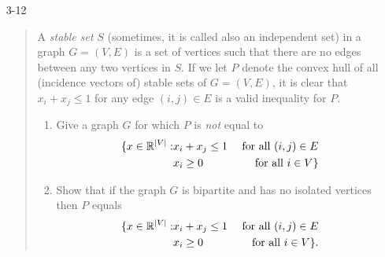 \documentclass[12pt]{article}
\begin{document}
\begin{enumerate}


\item[3-12]
\begin{quote}
A {\it stable set} $S$ (sometimes, it is called also an independent
set) in a graph $G=(V,E)$ is a set of vertices such that there are no
edges between any two vertices in $S$. If we let $P$ denote the convex
hull of all (incidence vectors of) stable sets of $G=(V,E)$, it is clear
that $x_i + x_j \leq 1$ for any edge $(i,j)\in E$ is a valid
inequality for $P$.

\begin{enumerate}
\item
Give a graph $G$ for which $P$ is {\it not} equal to
\begin{eqnarray*}
\{x\in {\mathbb R}^{|V|}: &  x_i + x_j \leq 1 & \mbox{ for all } (i,j)\in E \\
 &  x_i \geq 0 & \mbox{ for all } i \in V\}
\end{eqnarray*}

\item
Show that if the graph $G$ is bipartite and has no isolated vertices then $P$ equals
\begin{eqnarray*}
\{x\in {\mathbb R}^{|V|}: &  x_i + x_j \leq 1 & \mbox{ for all } (i,j)\in E \\
 &  x_i \geq 0 & \mbox{ for all } i \in V\}.
\end{eqnarray*}
\end{enumerate}
\end{quote}


\end{enumerate}
\end{document}
